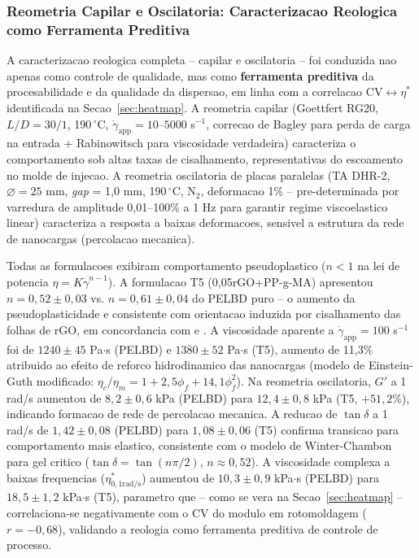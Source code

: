 \documentclass[11pt,a4paper,oneside]{article}
\begin{document}
\subsubsection{Reometria Capilar e Oscilatoria: Caracterizacao Reologica como Ferramenta Preditiva}

A caracterizacao reologica completa -- capilar e oscilatoria -- foi conduzida nao apenas como
controle de qualidade, mas como {\bfseries ferramenta preditiva} da procesabilidade e da
qualidade da dispersao, em linha com a correlacao CV${\leftrightarrow}\eta^*$ identificada
na Secao~\ref{sec:heatmap}. A reometria capilar (Goettfert RG20, $L/D{=}30/1$, 190$\,^{\circ}$C,
$\dot{\gamma}_{\text{app}}{=}10$--$5000$ s$^{-1}$, correcao de Bagley para perda de carga na
entrada + Rabinowitsch para viscosidade verdadeira) caracteriza o comportamento sob altas taxas
de cisalhamento, representativas do escoamento no molde de injecao. A reometria oscilatoria de
placas paralelas (TA DHR-2, $\varnothing{=}25$ mm, \textit{gap} = 1,0 mm, 190$\,^{\circ}$C,
N$_2$, deformacao 1\% -- pre-determinada por varredura de amplitude 0,01--100\% a 1 Hz para
garantir regime viscoelastico linear) caracteriza a resposta a baixas deformacoes, sensivel a
estrutura da rede de nanocargas (percolacao mecanica).

Todas as formulacoes exibiram comportamento pseudoplastico ($n{<}1$ na lei de potencia
$\eta{=}K\dot{\gamma}^{n-1}$). A formulacao T5 (0,05rGO+PP-g-MA) apresentou $n{=}0{,}52{\pm}0{,}03$
vs. $n{=}0{,}61{\pm}0{,}04$ do PELBD puro -- o aumento da pseudoplasticidade e consistente com
orientacao induzida por cisalhamento das folhas de rGO, em concordancia com \citet{Kim2010} e
\citet{Potts2011}. A viscosidade aparente a $\dot{\gamma}_{\text{app}}{=}100$ s$^{-1}$ foi de
$1240{\pm}45$ Pa$\cdot$s (PELBD) e $1380{\pm}52$ Pa$\cdot$s (T5), aumento de 11,3\% atribuido
ao efeito de reforco hidrodinamico das nanocargas (modelo de Einstein-Guth modificado:
$\eta_c/\eta_m{=}1{+}2{,}5\phi_f{+}14{,}1\phi_f^2$). Na reometria oscilatoria, $G'$ a 1 rad/s
aumentou de $8{,}2{\pm}0{,}6$ kPa (PELBD) para $12{,}4{\pm}0{,}8$ kPa (T5, $+51{,}2\%$),
indicando formacao de rede de percolacao mecanica. A reducao de $\tan\delta$ a 1 rad/s de
$1{,}42{\pm}0{,}08$ (PELBD) para $1{,}08{\pm}0{,}06$ (T5) confirma transicao para comportamento
mais elastico, consistente com o modelo de Winter-Chambon para gel critico
($\tan\delta{=}\tan(n\pi/2)$, $n{\approx}0{,}52$). A viscosidade complexa a baixas frequencias
($\eta^*_{0{,}1\text{rad/s}}$) aumentou de $10{,}3{\pm}0{,}9$ kPa$\cdot$s (PELBD) para
$18{,}5{\pm}1{,}2$ kPa$\cdot$s (T5), parametro que -- como se vera na Secao~\ref{sec:heatmap} --
correlaciona-se negativamente com o CV do modulo em rotomoldagem ($r{=}{-}0{,}68$), validando
a reologia como ferramenta preditiva de controle de processo.
\end{document}
